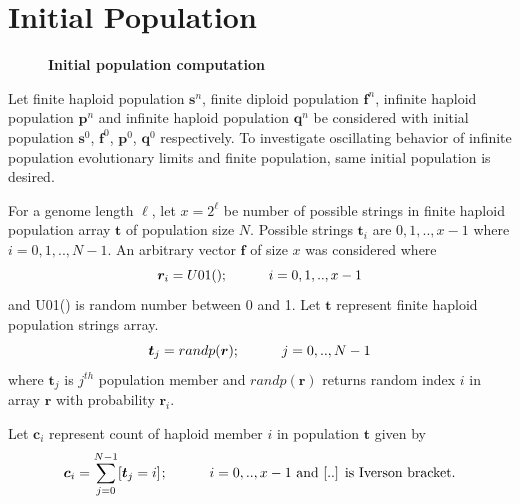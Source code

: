 \section{Initial Population}
\label{InitPopOsc}

\begin{figure}[H]
\begin{center}
\hspace{4pt}
\caption{\textbf{Initial population computation} }
\label{initialpop}
\end{center}
\end{figure}

Let finite haploid population $\bm{s}^n$, finite diploid population $\bm{f}^n$, infinite haploid population $\bm{p}^n$ 
and infinite haploid population $\bm{q}^n$ be considered with initial population $\bm{s}^0$, $\bm{f}^0$,
$\bm{p}^0$, $\bm{q}^0$ respectively. To investigate oscillating behavior of infinite population evolutionary limits 
and finite population, same initial population is desired. 

For a genome length $\ell$, let $x = 2^\ell$ be number of possible strings in finite haploid population array $\bm{t}$ of 
population size $N$. Possible strings $\bm{t}_i$ are ${0, 1,.., x-1}$ where $i = 0, 1,.., N-1$. An arbitrary vector $\bm{f}$ of size $x$ 
was considered where
\[
\bm{r}_i = U01(); \hspace{30pt} {i = 0, 1,.., x-1}
\]
and U01() is random number between 0 and 1.
Let $\bm{t}$ represent finite haploid population strings array.
\[
\bm{t}_j = randp(\bm{r}) ; \hspace{30pt} {j = 0,.., N-1}
\]
where $\bm{t}_j$ is $j^{th}$ population member and $randp(\bm{r})$ returns random index $i$ in array $\bm{r}$ with probability $\bm{r}_i$.

Let $\bm{c}_i$ represent count of haploid member $i$ in population $\bm{t}$ given by
\[
\bm{c}_i = \sum \limits_{j=0}^{N-1} [\bm{t}_j = i]  \hspace{0.01in}; \hspace{30pt}  {i = 0,.., x-1} \text{ and  [..]  is  Iverson bracket.}
\]

